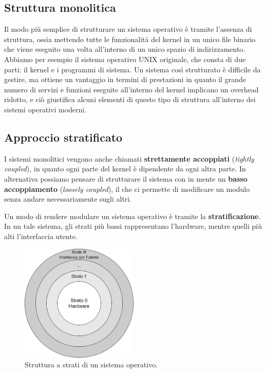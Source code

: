     \subsection{Struttura monolitica}
        Il modo più semplice di strutturare un sistema operativo è tramite l'assenza di struttura, ossia mettendo tutte le funzionalità del kernel in un unico file binario che viene eseguito una volta all'interno di un unico spazio di indirizzamento. Abbiamo per esempio il sistema operativo UNIX originale, che consta di due parti: il kernel e i programmi di sistema. Un sistema così strutturato è difficile da gestire, ma ottiene un vantaggio in termini di prestazioni in quanto il grande numero di servizi e funzioni eseguite all'interno del kernel implicano un overhead ridotto, e ciò giustifica alcuni elementi di questo tipo di struttura all'interno dei sistemi operativi moderni.
        
    \subsection{Approccio stratificato}
        I sistemi monolitici vengono anche chiamati \textbf{strettamente accoppiati} (\textit{tightly coupled}), in quanto ogni parte del kernel è dipendente da ogni altra parte. In alternativa possiamo pensare di strutturare il sistema con in mente un \textbf{basso accoppiamento} (\textit{loosely coupled}), il che ci permette di modificare un modulo senza andare necessariamente sugli altri.
        
        Un modo di rendere modulare un sistema operativo è tramite la \textbf{stratificazione}. In un tale sistema, gli strati più bassi rappresentano l'hardware, mentre quelli più alti l'interfaccia utente. 
        
        \begin{figure}
            \centering
            \includegraphics[width=0.5\textwidth]{img/img5.png}
            \caption{Struttura a strati di un sistema operativo.}
            \label{fig:img5}
        \end{figure}
        
